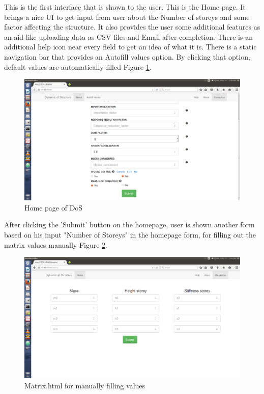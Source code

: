 This is the first interface that is shown to the user. This is the Home page.
It brings a nice UI to get input from user about the Number of storeys and 
some factor affecting the structure. It also provides the user some 
additional features as an aid like uploading data as CSV files and Email 
after completion. There is an additional help icon near every field to get 
an idea of what it is. There is a static navigation bar that provides an 
Autofill values option. By clicking that option, default values are 
automatically filled Figure \ref{fig:1}.

\begin{figure}[H] 
\centering \includegraphics[scale=0.32]{images/output/1.png}
\caption{Home page of DoS}
\label{fig:1}
\end{figure}

After clicking the 'Submit' button on the homepage, user is shown another 
form based on his input "Number of Storeys" in the homepage form, for 
filling out the matrix values manually Figure \ref{fig:2}.

\begin{figure}[H] 
\centering \includegraphics[scale=0.32]{images/output/2.png}
\caption{Matrix.html for manually filling values}
\label{fig:2}
\end{figure}

